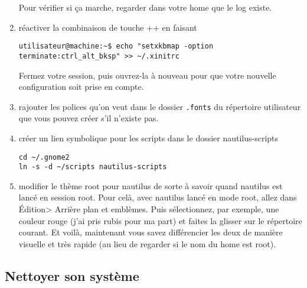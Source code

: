 \documentclass[a4paper,twoside]{article}
\begin{document}
\begin{enumerate}
\begin{remarque}
Pour vérifier si ça marche, regarder dans votre home que le log existe.
\end{remarque}

\item réactiver la combinaison de touche ++ en faisant
\begin{verbatim}
utilisateur@machine:~$ echo "setxkbmap -option terminate:ctrl_alt_bksp" >> ~/.xinitrc
\end{verbatim}

Fermez votre session, puis ouvrez-la à nouveau pour que votre nouvelle configuration soit prise en compte.

%


\item rajouter les polices qu'on veut dans le dossier \texttt{.fonts} du répertoire utilisateur que vous pouvez créer s'il n'existe pas.

\item créer un lien symbolique pour les scripts dans le dossier nautilus-scripts
\begin{verbatim}
cd ~/.gnome2
ln -s -d ~/scripts nautilus-scripts
\end{verbatim}

\item modifier le thème root pour nautilus de sorte à savoir quand nautilus est lancé en session root. Pour celà, avec nautilus lancé en mode root, allez dans Édition> Arrière plan et emblèmes. Puis sélectionnez, par exemple, une couleur rouge (j'ai pris rubis pour ma part) et faites la glisser sur le répertoire courant. Et voilà, maintenant vous savez différencier les deux de manière visuelle et très rapide (au lieu de regarder si le nom du home est root).

\end{enumerate}

\subsection{Nettoyer son système}
\end{document}
